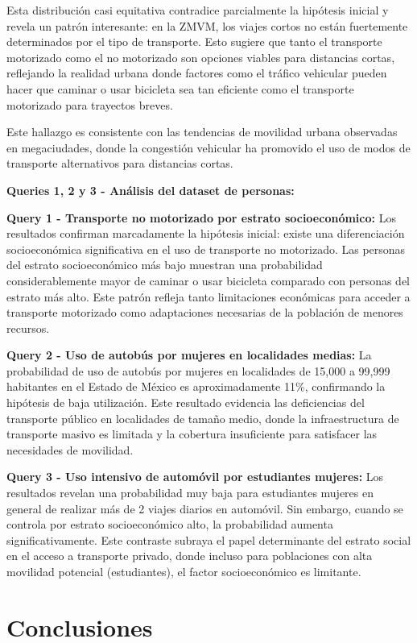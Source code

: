 \documentclass[12pt,a4paper]{article}
\begin{document}
Esta distribución casi equitativa contradice parcialmente la hipótesis inicial y revela un patrón interesante: en la ZMVM, los viajes cortos no están fuertemente determinados por el tipo de transporte. Esto sugiere que tanto el transporte motorizado como el no motorizado son opciones viables para distancias cortas, reflejando la realidad urbana donde factores como el tráfico vehicular pueden hacer que caminar o usar bicicleta sea tan eficiente como el transporte motorizado para trayectos breves.

Este hallazgo es consistente con las tendencias de movilidad urbana observadas en megaciudades, donde la congestión vehicular ha promovido el uso de modos de transporte alternativos para distancias cortas.

\textbf{Queries 1, 2 y 3 - Análisis del dataset de personas:}

\textbf{Query 1 - Transporte no motorizado por estrato socioeconómico:}
Los resultados confirman marcadamente la hipótesis inicial: existe una diferenciación socioeconómica significativa en el uso de transporte no motorizado. Las personas del estrato socioeconómico más bajo muestran una probabilidad considerablemente mayor de caminar o usar bicicleta comparado con personas del estrato más alto. Este patrón refleja tanto limitaciones económicas para acceder a transporte motorizado como adaptaciones necesarias de la población de menores recursos.

\textbf{Query 2 - Uso de autobús por mujeres en localidades medias:}
La probabilidad de uso de autobús por mujeres en localidades de 15,000 a 99,999 habitantes en el Estado de México es aproximadamente 11\%, confirmando la hipótesis de baja utilización. Este resultado evidencia las deficiencias del transporte público en localidades de tamaño medio, donde la infraestructura de transporte masivo es limitada y la cobertura insuficiente para satisfacer las necesidades de movilidad.

\textbf{Query 3 - Uso intensivo de automóvil por estudiantes mujeres:}
Los resultados revelan una probabilidad muy baja para estudiantes mujeres en general de realizar más de 2 viajes diarios en automóvil. Sin embargo, cuando se controla por estrato socioeconómico alto, la probabilidad aumenta significativamente. Este contraste subraya el papel determinante del estrato social en el acceso a transporte privado, donde incluso para poblaciones con alta movilidad potencial (estudiantes), el factor socioeconómico es limitante.

\section{Conclusiones}
\end{document}
